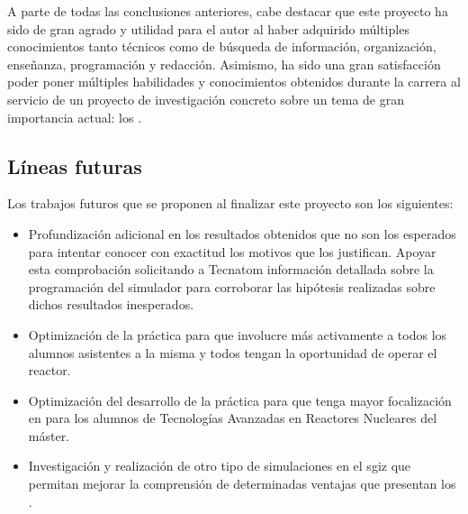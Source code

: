 A parte de todas las conclusiones anteriores, cabe destacar que este proyecto ha sido de gran agrado y utilidad para el autor al haber adquirido múltiples conocimientos tanto técnicos como de búsqueda de información, organización, enseñanza, programación y redacción. Asimismo, ha sido una gran satisfacción poder poner múltiples habilidades y conocimientos obtenidos durante la carrera al servicio de un proyecto de investigación concreto sobre un tema de gran importancia actual: los .


\newpage
\subsection{Líneas futuras}

Los trabajos futuros que se proponen al finalizar este proyecto son los siguientes:

\begin{itemize}
    \item Profundización adicional en los resultados obtenidos que no son los esperados para intentar conocer con exactitud los motivos que los justifican. Apoyar esta comprobación solicitando a Tecnatom información detallada sobre la programación del simulador para corroborar las hipótesis realizadas sobre dichos resultados inesperados.
    \item Optimización de la práctica para que involucre más activamente a todos los alumnos asistentes a la misma y todos tengan la oportunidad de operar el reactor.
    \item Optimización del desarrollo de la práctica para que tenga mayor focalización en  para los alumnos de Tecnologías Avanzadas en Reactores Nucleares del máster.
    \item Investigación y realización de otro tipo de simulaciones en el \acrshort{sgiz} que permitan mejorar la comprensión de determinadas ventajas que presentan los .
\end{itemize}